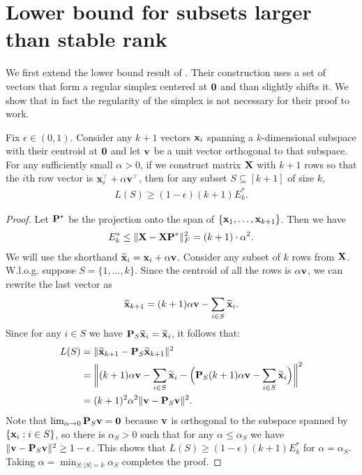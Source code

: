 \documentclass[12pt]{sty/colt2019/colt2018-arxiv}
\begin{document}
\section{Lower bound for subsets larger than stable rank}
We first extend the lower bound result of
\cite{pca-volume-sampling}. Their construction uses a set of vectors that
form a regular simplex centered at $\zero$ and than slightly
shifts it. We show that in fact the regularity of the simplex is not
necessary for their proof to work.
\begin{lemma}\label{l:simplex}
Fix $\epsilon\in(0,1)$.  Consider any $k+1$ vectors $\x_i$ spanning a
$k$-dimensional subspace with their centroid at $\zero$ and let $\v$
be a unit vector orthogonal to that subspace. For any sufficiently small
$\alpha>0$, if we construct
matrix $\X$ with $k+1$ rows so that the $i$th row vector is $\x_i^\top+\alpha\v^\top$, 
then for any subset $S\subseteq[k+1]$ of size $k$,
\begin{align*}
  L(S)\geq (1-\epsilon)(k+1) E_k^*.
  \end{align*}
\end{lemma}
\begin{proof}
Let $\P^*$ be the projection onto the span of
$\{\x_1,\dots,\x_{k+1}\}$. Then we have
\begin{align*}
  E_k^* \leq \|\X - \X\P^*\|_F^2 = (k+1)\cdot\alpha^2.
\end{align*}
We will use the shorthand $\xbt_i=\x_i+\alpha\v$. Consider any subset
of $k$ rows from $\X$. W.l.o.g. suppose 
$S=\{1,\dots,k\}$. Since the centroid of all the rows is $\alpha\v$,
we can rewrite the last vector as 
\begin{align*}
\xbt_{k+1} = (k+1)\alpha\v - \sum_{i\in S}\xbt_i.
\end{align*}
Since for any $i\in S$ we have $\P_S\xbt_i=\xbt_i$, it follows that:
\begin{align*}
  L(S) &= \|\xbt_{k+1} - \P_S\xbt_{k+1}\|^2 \\
  &=\bigg\| (k+1)\alpha\v - \sum_{i\in S}\xbt_i - \Big(\P_S (k+1)\alpha\v -
    \sum_{i\in S}\xbt_i\Big)\bigg\|^2\\
       &=(k+1)^2\alpha^2\|\v-\P_S\v\|^2.
\end{align*}
Note that $\lim_{\alpha\rightarrow 0}\P_S\v = \zero$ because $\v$
is orthogonal to the subspace spanned by $\{\x_i:i\in S\}$, so there is
$\alpha_S>0$ such that for any $\alpha\leq\alpha_S$ we have $\|\v-\P_S\v\|^2\geq 1-\epsilon$. This shows that
$L(S)\geq (1-\epsilon)(k+1)E_k^*$ for $\alpha=\alpha_S$. Taking
$\alpha = \min_{S:|S|=k}\alpha_S$ completes the proof.
\end{proof}
\end{document}
